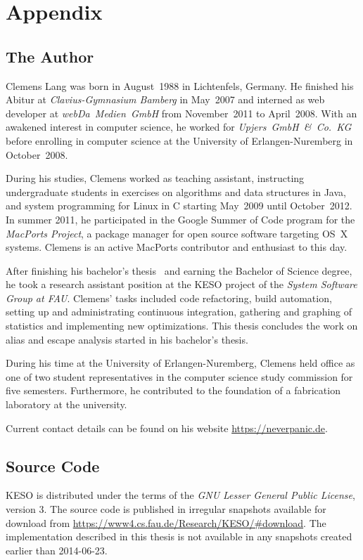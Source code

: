 
\chapter{Appendix}
	\label{chapter:appendix}

	\section{The Author}
		\label{sec:appendix:author}
		Clemens Lang was born in August~1988 in Lichtenfels, Germany. He finished his Abitur at \emph{Clavius-Gymnasium
		Bamberg} in May~2007 and interned as web developer at \emph{webDa~Medien~GmbH} from November~2011 to April~2008.
		With an awakened interest in computer science, he worked for \emph{Upjers~GmbH~\&~Co.~KG} before enrolling in
		computer science at the University of Erlangen-Nuremberg in October~2008.

		During his studies, Clemens worked as teaching assistant, instructing undergraduate students in exercises on
		algorithms and data structures in Java, and system programming for Linux in C starting May~2009 until October~2012.
		In summer 2011, he participated in the Google Summer of Code program for the \emph{MacPorts Project}, a package
		manager for open source software targeting OS~X systems. Clemens is an active MacPorts contributor and enthusiast to
		this day.

		After finishing his bachelor's thesis~\cite{lang:12} and earning the Bachelor of Science degree, he took a research
		assistant position at the KESO project of the \emph{System Software Group at FAU}. Clemens' tasks included code
		refactoring, build automation, setting up and administrating continuous integration, gathering and graphing of
		statistics and implementing new optimizations. This thesis concludes the work on alias and escape analysis started
		in his bachelor's thesis.

		During his time at the University of Erlangen-Nuremberg, Clemens held office as one of two student representatives
		in the computer science study commission for five semesters. Furthermore, he contributed to the foundation of
		a fabrication laboratory at the university.

		Current contact details can be found on his website \url{https://neverpanic.de}.

	\clearpage
	\section{Source Code}
		\label{sec:appendix:source}
		KESO is distributed under the terms of the \emph{GNU Lesser General Public License}, version 3. The source code is
		published in irregular snapshots available for download from \url{https://www4.cs.fau.de/Research/KESO/#download}.
		The implementation described in this thesis is not available in any snapshots created earlier than 2014-06-23.

